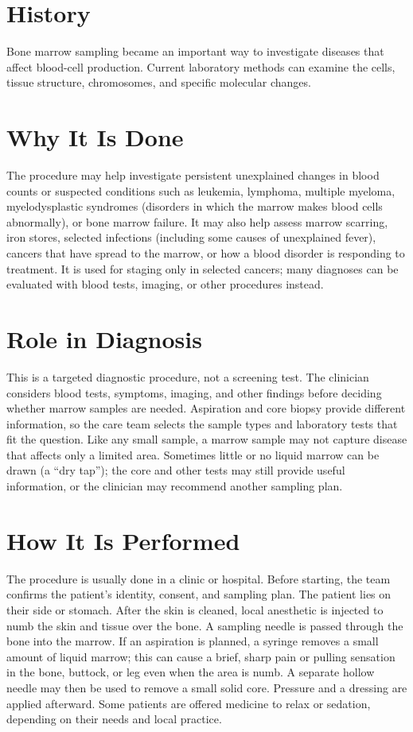 \section*{History}
Bone marrow sampling became an important way to investigate diseases that affect blood-cell production. Current laboratory methods can examine the cells, tissue structure, chromosomes, and specific molecular changes.

\section*{Why It Is Done}
The procedure may help investigate persistent unexplained changes in blood counts or suspected conditions such as leukemia, lymphoma, multiple myeloma, myelodysplastic syndromes (disorders in which the marrow makes blood cells abnormally), or bone marrow failure. It may also help assess marrow scarring, iron stores, selected infections (including some causes of unexplained fever), cancers that have spread to the marrow, or how a blood disorder is responding to treatment. It is used for staging only in selected cancers; many diagnoses can be evaluated with blood tests, imaging, or other procedures instead.

\section*{Role in Diagnosis}
This is a targeted diagnostic procedure, not a screening test. The clinician considers blood tests, symptoms, imaging, and other findings before deciding whether marrow samples are needed. Aspiration and core biopsy provide different information, so the care team selects the sample types and laboratory tests that fit the question. Like any small sample, a marrow sample may not capture disease that affects only a limited area. Sometimes little or no liquid marrow can be drawn (a “dry tap”); the core and other tests may still provide useful information, or the clinician may recommend another sampling plan.

\section*{How It Is Performed}
The procedure is usually done in a clinic or hospital. Before starting, the team confirms the patient's identity, consent, and sampling plan. The patient lies on their side or stomach. After the skin is cleaned, local anesthetic is injected to numb the skin and tissue over the bone. A sampling needle is passed through the bone into the marrow. If an aspiration is planned, a syringe removes a small amount of liquid marrow; this can cause a brief, sharp pain or pulling sensation in the bone, buttock, or leg even when the area is numb. A separate hollow needle may then be used to remove a small solid core. Pressure and a dressing are applied afterward. Some patients are offered medicine to relax or sedation, depending on their needs and local practice.

